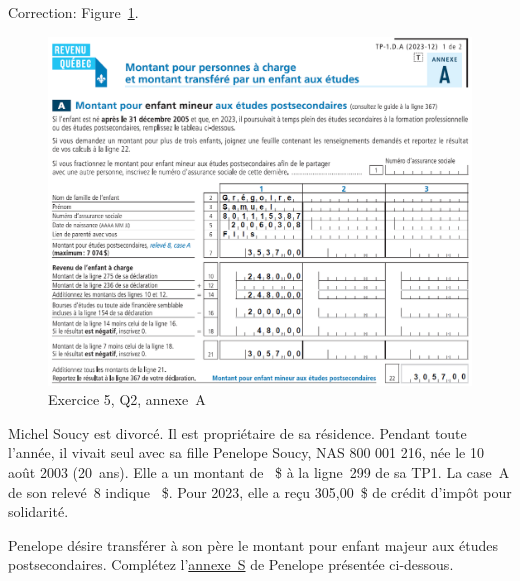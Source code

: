 Correction: Figure~\ref{fig:chap4Exercice5Q2AnnexeA}.
\begin{figure}
	\centering
	\includegraphics[width=.9\textwidth]{exercice/4-5/Q2/Annexe-A.png}
	\caption{Exercice 5, Q2, annexe~A}
	\label{fig:chap4Exercice5Q2AnnexeA}
\end{figure}


\begin{question}
	Michel Soucy est divorcé. Il est propriétaire de sa résidence. Pendant toute l'année, il vivait seul avec sa fille Penelope Soucy, NAS 800 001 216, née le 10 août 2003 (20~ans). Elle a un montant de ~\$ à la ligne~299 de sa TP1. La case~A de son relevé~8 indique ~\$. Pour 2023, elle a reçu 305,00~\$ de crédit d'impôt pour solidarité.
\end{question}
\setcounter{sousQuestion}{0}
\begin{sousQuestion}
	Penelope désire transférer à son père le montant pour enfant majeur aux études postsecondaires. Complétez l'\href{https://www.revenuquebec.ca/documents/fr/formulaires/tp/2023-12/TP-1.D.S%282023-12%29.pdf}{annexe~S} de Penelope présentée ci-dessous.
\end{sousQuestion}

